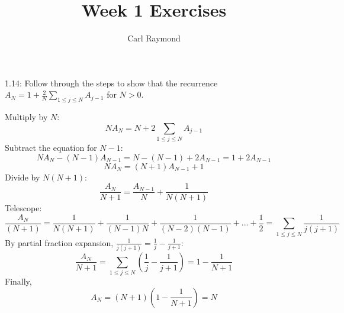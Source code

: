 \documentclass[11pt, oneside]{article}   	%
\title{Week 1 Exercises}
\author{Carl Raymond}
\begin{document}
\maketitle

1.14: Follow through the steps to show that the recurrence $A_N = 1 + \frac{2}{N}\sum_{1 \le j \le N} A_{j-1}$ for $N>0$.

Multiply by $N$:
\[
	N A_N = N + 2 \sum_{1 \le j \le N} A_{j-1}
\]
Subtract the equation for $N-1$:
\[
	NA_N - (N-1)A_{N-1} = N-(N-1) + 2A_{N-1} = 1 + 2 A_{N-1}
\]
\[
	NA_N = (N+1)A_{N-1} + 1
\]
Divide by $N(N+1)$:
\[
	\frac{A_N}{N+1} = \frac{A_{N-1}}{N} + \frac{1}{N(N+1)}
\]
Telescope:
\[
	\frac{A_N}{(N+1)} = \frac{1}{N(N+1)} + \frac{1}{(N-1)N} + \frac{1}{(N-2)(N-1)} + \dots + \frac{1}{2} = \sum_{1 \le j \le N} \frac{1}{j(j+1)}
\]
By partial fraction expansion, $\frac{1}{j(j+1)} = \frac{1}{j}-\frac{1}{j+1}$:
\[
	\frac{A_N}{N+1} = \sum_{1 \le j \le N}(\frac{1}{j} - \frac{1}{j+1})  = 1-\frac{1}{N+1}
\]
Finally,
\[
	A_N = (N+1)(1-\frac{1}{N+1}) = N
\]
\end{document}

